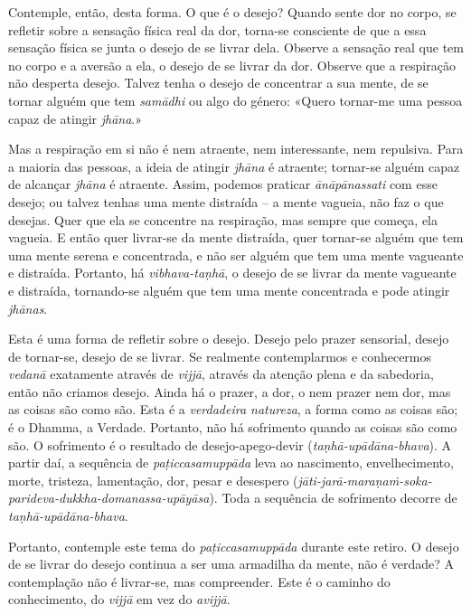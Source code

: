 Contemple, então, desta forma. O que é o desejo? Quando sente dor no corpo, se
refletir sobre a sensação física real da dor, torna-se consciente de que a essa
sensação física se junta o desejo de se livrar dela. Observe a sensação real que
tem no corpo e a aversão a ela, o desejo de se livrar da dor. Observe que a
respiração não desperta desejo. Talvez tenha o desejo de concentrar a sua mente,
de se tornar alguém que tem \emph{samādhi} ou algo do género: «Quero tornar-me
uma pessoa capaz de atingir \emph{jhāna}.»

Mas a respiração em si não é nem atraente, nem interessante, nem repulsiva. Para
a maioria das pessoas, a ideia de atingir \emph{jhāna} é atraente; tornar-se
alguém capaz de alcançar \emph{jhāna} é atraente. Assim, podemos praticar
\emph{ānāpānassati} com esse desejo; ou talvez tenhas uma mente distraída -- a
mente vagueia, não faz o que desejas. Quer que ela se concentre na respiração,
mas sempre que começa, ela vagueia. E então quer livrar-se da mente distraída,
quer tornar-se alguém que tem uma mente serena e concentrada, e não ser alguém
que tem uma mente vagueante e distraída. Portanto, há \emph{vibhava-taṇhā}, o
desejo de se livrar da mente vagueante e distraída, tornando-se alguém que tem
uma mente concentrada e pode atingir \emph{jhānas}.

Esta é uma forma de refletir sobre o desejo. Desejo pelo prazer sensorial,
desejo de tornar-se, desejo de se livrar. Se realmente contemplarmos e
conhecermos \emph{vedanā} exatamente através de \emph{vijjā}, através da atenção
plena e da sabedoria, então não criamos desejo. Ainda há o prazer, a dor, o nem
prazer nem dor, mas as coisas são como são. Esta é a \emph{verdadeira natureza},
a forma como as coisas são; é o Dhamma, a Verdade. Portanto, não há sofrimento
quando as coisas são como são. O sofrimento é o resultado de
desejo-apego-devir (\emph{taṇhā-upādāna-bhava}). A partir daí, a sequência
de \emph{paṭiccasamuppāda} leva ao nascimento, envelhecimento, morte, tristeza,
lamentação, dor, pesar e desespero
(\emph{jāti-jarā-maraṇaṁ-soka-parideva-dukkha-domanassa-upāyāsa}). Toda a
sequência de sofrimento decorre de \emph{taṇhā-upādāna-bhava}.

Portanto, contemple este tema do \emph{paṭiccasamuppāda} durante este retiro. O
desejo de se livrar do desejo continua a ser uma armadilha da mente, não é
verdade? A contemplação não é livrar-se, mas compreender. Este é o caminho do
conhecimento, do \emph{vijjā} em vez do \emph{avijjā}.

